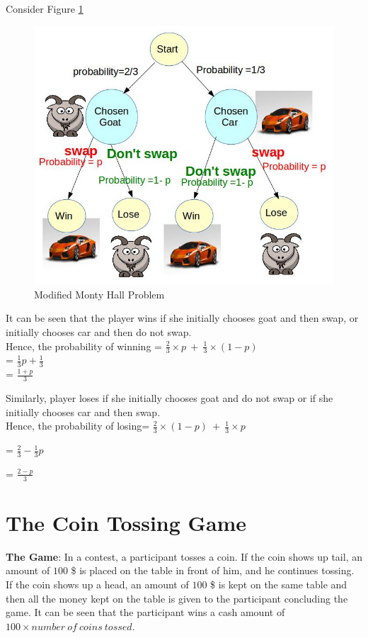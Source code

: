 \documentclass[11pt,fleqn]{book} %
\begin{document}
Consider Figure \ref{modi}
\begin{figure}[h]
\centering
\includegraphics[width=\textwidth]{goat.jpg}
\caption{Modified Monty Hall Problem}
\label{modi}
\end{figure}

It can be seen that the player wins if she initially chooses goat and then swap, or initially chooses car and then do not swap.\\

Hence, the probability of winning = $\frac{2}{3} \times p\ +\ \frac{1}{3} \times (1-p)$\\

= $\frac{1}{3}p + \frac{1}{3}$\\

= $\frac{1+p}{3}$

Similarly, player loses if she initially chooses goat and do not swap or if she initially chooses car and then swap. \\

Hence, the probability of losing= $\frac{2}{3} \times (1-p)\ +\ \frac{1}{3} \times p$

= $\frac{2}{3} - \frac{1}{3}p$

= $\frac{2-p}{3}$ 

\section{The Coin Tossing Game}
\textbf{The Game}: In a contest, a participant tosses a coin. If the coin shows up tail, an amount of $100$ \$ is placed on the table in front of him, and he continues tossing. If the coin shows up a head, an amount of $100$ \$ is kept on the same table and then all the money kept on the table is given to the participant concluding the game. It can be seen that the participant wins a cash amount of $100 \times number\ of\ coins\ tossed$. \\
\end{document}
